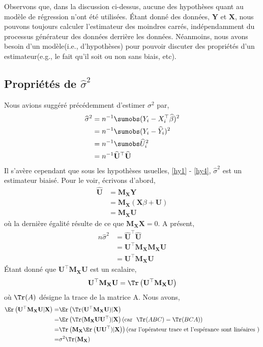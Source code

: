 Observons que, dans la discussion ci-dessus, aucune des hypothèses quant au modèle de régression n'ont été utilisées. \'Etant donné des données, $\mathbf{Y}$ et $\mathbf{X}$, nous pouvons toujours calculer l'estimateur des moindres carrés, indépendamment du processus générateur des données derrière les données. Néanmoins, nous avons besoin d'un modèle(i.e., d'hypothèses) pour pouvoir discuter des propriétés d'un estimateur(e.g., le fait qu'il soit ou non sans biais, etc).

\subsection{Propriétés de $\widehat{\sigma}^2$}
Nous avions suggéré précédemment d'estimer $\sigma^2$ par,
\begin{align*}
\widehat{\sigma}^2 &= n^{-1}\sumobs (Y_i-X_i^\top\widehat{\beta})^2\\
&= n^{-1}\sumobs (Y_i-\widehat{Y}_i)^2\\
&= n^{-1}\sumobs \widehat{U}_i^2\\
& =  n^{-1}\widehat{\mathbf{U}}^\top\widehat{\mathbf{U}}
\end{align*}
Il s'avère cependant que sous les hypothèses usuelles, \ref{hy1} - \ref{hy4}, $\widehat{\sigma}^2$ est un estimateur biaisé. Pour le voir, écrivons d'abord,
\begin{align*}
\widehat{\mathbf{U}} &= \mathbf{M}_\mathbf{X}\mathbf{Y}\\
& = \mathbf{M}_\mathbf{X}(\mathbf{X}\beta + \mathbf{U})\\
& = \mathbf{M}_\mathbf{X}\mathbf{U}
\end{align*}
où la dernière égalité résulte de ce que $\mathbf{M}_\mathbf{X}\mathbf{X} = 0$. A présent,
\begin{align*}
n\widehat{\sigma}^2 &= \widehat{\mathbf{U}}^\top\widehat{\mathbf{U}}\\
& = \mathbf{U}^\top\mathbf{M}_\mathbf{X}\mathbf{M}_\mathbf{X}\mathbf{U} \\
&= \mathbf{U}^\top\mathbf{M}_\mathbf{X}\mathbf{U}
\end{align*}
\'Etant donné que $\mathbf{U}^\top\mathbf{M}_\mathbf{X}\mathbf{U}$ est un scalaire,
\begin{align*}
\mathbf{U}^\top\mathbf{M}_\mathbf{X}\mathbf{U} = \Tr\left(\mathbf{U}^\top\mathbf{M}_\mathbf{X}\mathbf{U}\right)
\end{align*}
où $\Tr(A)$ désigne la trace de la matrice A. Nous avons,
\begin{align*}
\Er\left(\mathbf{U}^\top\mathbf{M}_\mathbf{X}\mathbf{U}|\mathbf{X}\right) =&  \Er\left(\Tr(\mathbf{U}^\top\mathbf{M}_\mathbf{X}\mathbf{U})|\mathbf{X}\right)\\
=&\Er\left(\Tr(\mathbf{M}_\mathbf{X}\mathbf{U}\mathbf{U}^\top)|\mathbf{X}\right)(\textrm{car \ } \Tr(ABC) = \Tr(BCA))\\
=&\Tr\left(\mathbf{M}_\mathbf{X}\Er\left(\mathbf{U}\mathbf{U}^\top)|\mathbf{X}\right)\right)(\textrm{car l'opérateur trace et l'espérance sont linéaires })\\
=&\sigma^2\Tr(\mathbf{M}_\mathbf{X})
\end{align*}
